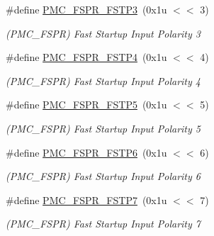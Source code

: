 \begin{DoxyCompactItemize}
\mbox{\label{group__SAMS70__PMC_ga1d8ee2db1a6fdb081cb43a505f13f69e}} 
\#define \mbox{\hyperlink{group__SAMS70__PMC_ga1d8ee2db1a6fdb081cb43a505f13f69e}{P\+M\+C\+\_\+\+F\+S\+P\+R\+\_\+\+F\+S\+T\+P3}}~(0x1u $<$$<$ 3)
\begin{DoxyCompactList}\small\item\em (P\+M\+C\+\_\+\+F\+S\+PR) Fast Startup Input Polarity 3 \end{DoxyCompactList}\item 
\mbox{\label{group__SAMS70__PMC_gace394bf7a6669894004a5686b22314ee}} 
\#define \mbox{\hyperlink{group__SAMS70__PMC_gace394bf7a6669894004a5686b22314ee}{P\+M\+C\+\_\+\+F\+S\+P\+R\+\_\+\+F\+S\+T\+P4}}~(0x1u $<$$<$ 4)
\begin{DoxyCompactList}\small\item\em (P\+M\+C\+\_\+\+F\+S\+PR) Fast Startup Input Polarity 4 \end{DoxyCompactList}\item 
\mbox{\label{group__SAMS70__PMC_gafe90d4e41210a882dd735eb1805cc6ca}} 
\#define \mbox{\hyperlink{group__SAMS70__PMC_gafe90d4e41210a882dd735eb1805cc6ca}{P\+M\+C\+\_\+\+F\+S\+P\+R\+\_\+\+F\+S\+T\+P5}}~(0x1u $<$$<$ 5)
\begin{DoxyCompactList}\small\item\em (P\+M\+C\+\_\+\+F\+S\+PR) Fast Startup Input Polarity 5 \end{DoxyCompactList}\item 
\mbox{\label{group__SAMS70__PMC_ga7ba8d250dfcbbb84f799bcdd3e90e241}} 
\#define \mbox{\hyperlink{group__SAMS70__PMC_ga7ba8d250dfcbbb84f799bcdd3e90e241}{P\+M\+C\+\_\+\+F\+S\+P\+R\+\_\+\+F\+S\+T\+P6}}~(0x1u $<$$<$ 6)
\begin{DoxyCompactList}\small\item\em (P\+M\+C\+\_\+\+F\+S\+PR) Fast Startup Input Polarity 6 \end{DoxyCompactList}\item 
\mbox{\label{group__SAMS70__PMC_gacd1d93773f32f90714a2bbc198389259}} 
\#define \mbox{\hyperlink{group__SAMS70__PMC_gacd1d93773f32f90714a2bbc198389259}{P\+M\+C\+\_\+\+F\+S\+P\+R\+\_\+\+F\+S\+T\+P7}}~(0x1u $<$$<$ 7)
\begin{DoxyCompactList}\small\item\em (P\+M\+C\+\_\+\+F\+S\+PR) Fast Startup Input Polarity 7 \end{DoxyCompactList}\item 
$$
\end{DoxyCompactItemize}
